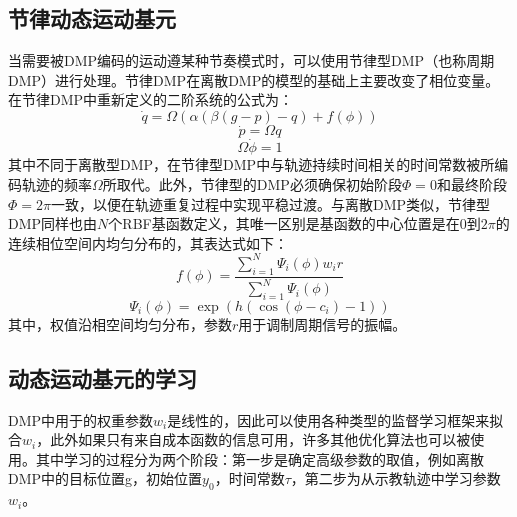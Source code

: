 \subsection{节律动态运动基元}
当需要被DMP编码的运动遵某种节奏模式时，可以使用节律型DMP（也称周期DMP）进行处理。节律DMP在离散DMP的模型的基础上主要改变了相位变量。在节律DMP中重新定义的二阶系统的公式为：
\begin{equation}
    \dot{q}=\Omega(\alpha(\beta(g-p)-q)+f(\phi))
    \label{eq:2-8}
\end{equation}
\begin{equation}
    \dot{p}=\Omega q
    \label{eq:2-9}
\end{equation}
\begin{equation}
    \Omega \dot{\phi}=1
    \label{eq:2-10}
\end{equation}
其中不同于离散型DMP，在节律型DMP中与轨迹持续时间相关的时间常数被所编码轨迹的频率$\Omega$所取代。此外，节律型的DMP必须确保初始阶段$\Phi = 0$和最终阶段$\Phi = 2\pi$一致，以便在轨迹重复过程中实现平稳过渡。与离散DMP类似，节律型DMP同样也由$N$个RBF基函数定义，其唯一区别是基函数的中心位置是在0到$2\pi$的连续相位空间内均匀分布的，其表达式如下：
\begin{equation}
    f(\phi)=\frac{\sum_{i=1}^N \Psi_i(\phi) w_i r}{\sum_{i=1}^N \Psi_i(\phi)}
    \label{eq:2-11}
\end{equation}
\begin{equation}
    \Psi_i(\phi)=\exp \left(h\left(\cos \left(\phi-c_i\right)-1\right)\right)
    \label{eq:2-12}
\end{equation}
其中，权值沿相空间均匀分布，参数$r$用于调制周期信号的振幅。
\subsection{动态运动基元的学习}
DMP中用于的权重参数$w_i$是线性的，因此可以使用各种类型的监督学习框架来拟合$w_i$，此外如果只有来自成本函数的信息可用，许多其他优化算法也可以被使用。其中学习的过程分为两个阶段\cite{saverianoDynamicMovementPrimitives2023}：第一步是确定高级参数的取值，例如离散DMP中的目标位置g，初始位置$y_0$，时间常数$τ$，第二步为从示教轨迹中学习参数$w_i$。

